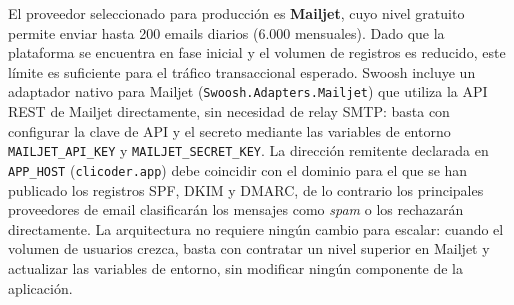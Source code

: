 El proveedor seleccionado para producción es \textbf{Mailjet}, cuyo nivel gratuito permite enviar hasta 200 emails diarios (6.000 mensuales). Dado que la plataforma se encuentra en fase inicial y el volumen de registros es reducido, este límite es suficiente para el tráfico transaccional esperado. Swoosh incluye un adaptador nativo para Mailjet (\texttt{Swoosh.Adapters.Mailjet}) que utiliza la API REST de Mailjet directamente, sin necesidad de relay SMTP: basta con configurar la clave de API y el secreto mediante las variables de entorno \texttt{MAILJET\_API\_KEY} y \texttt{MAILJET\_SECRET\_KEY}. La dirección remitente declarada en \texttt{APP\_HOST} (\texttt{clicoder.app}) debe coincidir con el dominio para el que se han publicado los registros SPF, DKIM y DMARC, de lo contrario los principales proveedores de email clasificarán los mensajes como \emph{spam} o los rechazarán directamente. La arquitectura no requiere ningún cambio para escalar: cuando el volumen de usuarios crezca, basta con contratar un nivel superior en Mailjet y actualizar las variables de entorno, sin modificar ningún componente de la aplicación.
